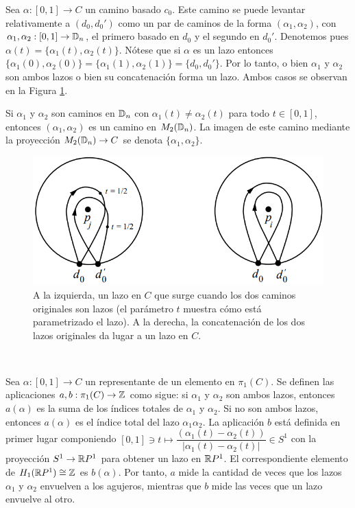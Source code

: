 \documentclass[TFG.tex]{subfiles}
\begin{document}

Sea $\alpha:[0,1]\to C$ un camino basado $c_0$. Este camino se puede levantar relativamente a $(d_0,d_0')$ como un par de caminos de la forma $(\alpha_1,\alpha_2)$, con $\alpha_1,\alpha_2:[0,1]\to\mathbb{D}_n$, el primero basado en $d_0$ y el segundo en $d_0'$. Denotemos pues $\alpha(t)=\{\alpha_1(t),\alpha_2(t)\}$. Nótese que si $\alpha$ es un lazo entonces $\{\alpha_1(0),\alpha_2(0)\}=\{\alpha_1(1),\alpha_2(1)\}=\{d_0,d_0'\}$. Por lo tanto, o bien $\alpha_1$ y $\alpha_2$ son ambos lazos o bien su concatenación forma un lazo. Ambos casos se observan en la Figura \ref{loop}. 




Si $\alpha_1$ y $\alpha_2$ son caminos en $\mathbb{D}_n$ con $\alpha_1(t)\neq\alpha_2(t)$ para todo $t\in[0,1]$, entonces $(\alpha_1,\alpha_2)$ es un camino en $M_2(\mathbb{D}_n)$. La imagen de este camino mediante la proyección $M_2(\mathbb{D}_n)\to C$ se denota $\{\alpha_1,\alpha_2\}$.

\begin{figure}[h!]
\includegraphics[scale=0.55]{Imagenes/loop}
\caption{A la izquierda, un lazo en $C$ que surge cuando los dos caminos originales son lazos (el parámetro $t$ muestra cómo está parametrizado el lazo). A la derecha, la concatenación de los dos lazos originales da lugar a un lazo en $C$.}\label{loop}
\end{figure}\

Sea $\alpha:[0,1]\to C$ un representante de un elemento en $\pi_1(C)$. Se definen las aplicaciones $a,b:\pi_1(C)\to\mathbb{Z}$ como sigue: si $\alpha_1$ y $\alpha_2$ son ambos lazos, entonces $a(\alpha)$ es la suma de los índices totales de $\alpha_1$ y $\alpha_2$. Si no son ambos lazos, entonces $a(\alpha)$ es el índice total del lazo $\alpha_1\alpha_2$. La aplicación $b$ está definida en primer lugar componiendo $[0,1]\ni t\mapsto \dfrac{(\alpha_1(t)-\alpha_2(t))}{|\alpha_1(t)-\alpha_2(t)|}\in S^1$ con la proyección $S^1\to \mathbb{R} P^1$ para obtener un lazo en $\mathbb{R} P^1$. El correspondiente elemento de $H_1(\mathbb{R} P^1)\cong\mathbb{Z}$ es $b(\alpha)$. Por tanto, $a$ mide la cantidad de veces que los lazos $\alpha_1$ y $\alpha_2$ envuelven a los agujeros, mientras que $b$ mide las veces que un lazo envuelve al otro.
\end{document}
